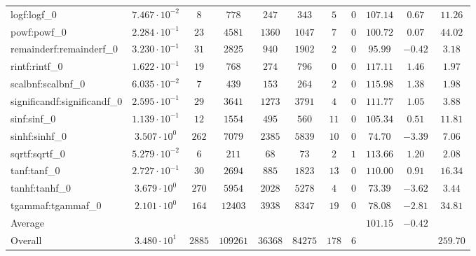 \begin{tabular}{|l|c|c|c|c|c|c|c|c|c|c|}
logf:logf\_0                 & $ 7.467 \cdot 10^{-2} $ & $ 8      $ & $ 778    $ & $ 247   $ & $ 343   $ & $ 5   $ & $ 0 $ & $ 107.14      $ & $ 0.67    $ & $ 11.26   $ \\
powf:powf\_0                 & $ 2.284 \cdot 10^{-1} $ & $ 23     $ & $ 4581   $ & $ 1360  $ & $ 1047  $ & $ 7   $ & $ 0 $ & $ 100.72      $ & $ 0.07    $ & $ 44.02   $ \\
remainderf:remainderf\_0     & $ 3.230 \cdot 10^{-1} $ & $ 31     $ & $ 2825   $ & $ 940   $ & $ 1902  $ & $ 2   $ & $ 0 $ & $ 95.99       $ & $ -0.42   $ & $ 3.18    $ \\
rintf:rintf\_0               & $ 1.622 \cdot 10^{-1} $ & $ 19     $ & $ 768    $ & $ 274   $ & $ 796   $ & $ 0   $ & $ 0 $ & $ 117.11      $ & $ 1.46    $ & $ 1.97    $ \\
scalbnf:scalbnf\_0           & $ 6.035 \cdot 10^{-2} $ & $ 7      $ & $ 439    $ & $ 153   $ & $ 264   $ & $ 2   $ & $ 0 $ & $ 115.98      $ & $ 1.38    $ & $ 1.98    $ \\
significandf:significandf\_0 & $ 2.595 \cdot 10^{-1} $ & $ 29     $ & $ 3641   $ & $ 1273  $ & $ 3791  $ & $ 4   $ & $ 0 $ & $ 111.77      $ & $ 1.05    $ & $ 3.88    $ \\
sinf:sinf\_0                 & $ 1.139 \cdot 10^{-1} $ & $ 12     $ & $ 1554   $ & $ 495   $ & $ 560   $ & $ 11  $ & $ 0 $ & $ 105.34      $ & $ 0.51    $ & $ 11.81   $ \\
sinhf:sinhf\_0               & $ 3.507 \cdot 10^{0}  $ & $ 262    $ & $ 7079   $ & $ 2385  $ & $ 5839  $ & $ 10  $ & $ 0 $ & $ 74.70       $ & $ -3.39   $ & $ 7.06    $ \\
sqrtf:sqrtf\_0               & $ 5.279 \cdot 10^{-2} $ & $ 6      $ & $ 211    $ & $ 68    $ & $ 73    $ & $ 2   $ & $ 1 $ & $ 113.66      $ & $ 1.20    $ & $ 2.08    $ \\
tanf:tanf\_0                 & $ 2.727 \cdot 10^{-1} $ & $ 30     $ & $ 2694   $ & $ 885   $ & $ 1823  $ & $ 13  $ & $ 0 $ & $ 110.00      $ & $ 0.91    $ & $ 16.34   $ \\
tanhf:tanhf\_0               & $ 3.679 \cdot 10^{0}  $ & $ 270    $ & $ 5954   $ & $ 2028  $ & $ 5278  $ & $ 4   $ & $ 0 $ & $ 73.39       $ & $ -3.62   $ & $ 3.44    $ \\
tgammaf:tgammaf\_0           & $ 2.101 \cdot 10^{0}  $ & $ 164    $ & $ 12403  $ & $ 3938  $ & $ 8347  $ & $ 19  $ & $ 0 $ & $ 78.08       $ & $ -2.81   $ & $ 34.81   $ \\
\hline
Average                      & $                     $ & $        $ & $        $ & $       $ & $       $ & $     $ & $   $ & $ 101.15      $ & $ -0.42   $ & $         $ \\
\hline
Overall                      & $ 3.480 \cdot 10^{1}  $ & $ 2885   $ & $ 109261 $ & $ 36368 $ & $ 84275 $ & $ 178 $ & $ 6 $ & $             $ & $         $ & $ 259.70  $ \\
\hline
\end{tabular}
